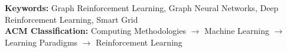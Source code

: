 \documentclass[11pt,a4paper]{article}
\newcommand{\titles}[2]{\noindent\textbf{#1:} #2\\[2mm]}
\begin{document}
\titles{Keywords}{Graph Reinforcement Learning, Graph Neural Networks, Deep Reinforcement Learning, Smart Grid}
\titles{ACM Classification}{Computing Methodologies $\to$ Machine Learning $\to$ Learning Paradigms $\to$ Reinforcement Learning}

\nocite{*}  %



\end{document}
